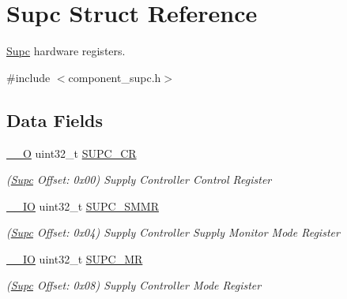 \hypertarget{structSupc}{}\section{Supc Struct Reference}
\label{structSupc}


\mbox{\hyperlink{structSupc}{Supc}} hardware registers.  




{\ttfamily \#include $<$component\+\_\+supc.\+h$>$}

\subsection*{Data Fields}
\begin{DoxyCompactItemize}
\item 
\mbox{\label{structSupc_a1260dc5318dd4785bbf9fa3b16b25cc4}} 
\mbox{\hyperlink{core__cm7_8h_a7e25d9380f9ef903923964322e71f2f6}{\+\_\+\+\_\+O}} uint32\+\_\+t \mbox{\hyperlink{structSupc_a1260dc5318dd4785bbf9fa3b16b25cc4}{S\+U\+P\+C\+\_\+\+CR}}
\begin{DoxyCompactList}\small\item\em (\mbox{\hyperlink{structSupc}{Supc}} Offset\+: 0x00) Supply Controller Control Register \end{DoxyCompactList}\item 
\mbox{\label{structSupc_a3f6870f0cea8f2a7e4939f9b34a2bdd3}} 
\mbox{\hyperlink{core__cm7_8h_aec43007d9998a0a0e01faede4133d6be}{\+\_\+\+\_\+\+IO}} uint32\+\_\+t \mbox{\hyperlink{structSupc_a3f6870f0cea8f2a7e4939f9b34a2bdd3}{S\+U\+P\+C\+\_\+\+S\+M\+MR}}
\begin{DoxyCompactList}\small\item\em (\mbox{\hyperlink{structSupc}{Supc}} Offset\+: 0x04) Supply Controller Supply Monitor Mode Register \end{DoxyCompactList}\item 
\mbox{\label{structSupc_a40b3012d555416674d7a4bdd33d24899}} 
\mbox{\hyperlink{core__cm7_8h_aec43007d9998a0a0e01faede4133d6be}{\+\_\+\+\_\+\+IO}} uint32\+\_\+t \mbox{\hyperlink{structSupc_a40b3012d555416674d7a4bdd33d24899}{S\+U\+P\+C\+\_\+\+MR}}
\begin{DoxyCompactList}\small\item\em (\mbox{\hyperlink{structSupc}{Supc}} Offset\+: 0x08) Supply Controller Mode Register \end{DoxyCompactList}\item 

\end{DoxyCompactItemize}
